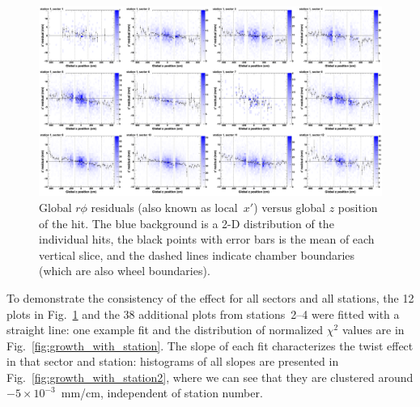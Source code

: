 \documentclass[12pt]{article}
\begin{document}
\begin{figure}
\includegraphics[width=\linewidth]{twist2.png}
\caption{Global $r\phi$ residuals (also known as local~$x'$) versus
  global $z$ position of the hit.  The blue background is a 2-D
  distribution of the individual hits, the black points with error
  bars is the mean of each vertical slice, and the dashed lines
  indicate chamber boundaries (which are also wheel
  boundaries).  \label{fig:twist2}}
\end{figure}

To demonstrate the consistency of the effect for all sectors and all
stations, the 12 plots in Fig.~\ref{fig:twist2} and the 38 additional
plots from stations~2--4 were fitted with a straight line: one example
fit and the distribution of normalized $\chi^2$ values are in
Fig.~\ref{fig:growth_with_station}.  The slope of each fit
characterizes the twist effect in that sector and station: histograms
of all slopes are presented in Fig.~\ref{fig:growth_with_station2},
where we can see that they are clustered around $-5\times
10^{-3}$~mm/cm, independent of station number.
\end{document}
